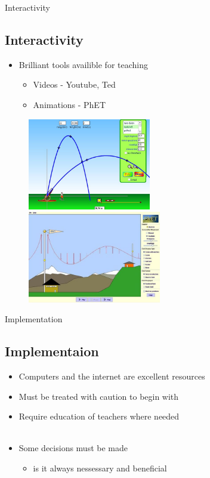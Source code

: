 \documentclass{beamer}
\begin{document}
\begin{frame}{Interactivity}
    \subsection{Interactivity}
    \begin{itemize}
        \item Brilliant tools availible for teaching
        \begin{itemize}
            \item Videos - Youtube, Ted
            \item Animations - PhET
        \end{itemize}
    \end{itemize}
    \begin{figure}
        \includegraphics[height=4cm]{phet-1.jpg}
         ~
        \includegraphics[height=4cm]{phet-2.jpg}
    \end{figure}
\end{frame}

\begin{frame}{Implementation}
    \subsection{Implementaion}
    \begin{itemize}
        \item Computers and the internet are excellent resources
        \item Must be treated with caution to begin with
        \item Require education of teachers where needed \\~\\
        \item Some decisions must be made
        \begin{itemize}
                \item is it always nessessary and beneficial
        \end{itemize}
    \end{itemize}
\end{frame}
\end{document}
